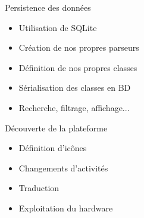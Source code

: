 \documentclass{beamer}
\begin{document}
		\begin{frame}
		Persistence des données
			\begin{itemize}
			\item Utilisation de SQLite
			\item Création de nos propres parseurs
			\item Définition de nos propres classes
			\item Sérialisation des classes en BD
			\item Recherche, filtrage, affichage...
			\end{itemize}
		\end{frame}
		
		\begin{frame}
		Découverte de la plateforme
			\begin{itemize}
			\item Définition d'icônes
			\item Changements d'activités
			\item Traduction
			\item Exploitation du hardware
			\end{itemize}
		\end{frame}
\end{document}
